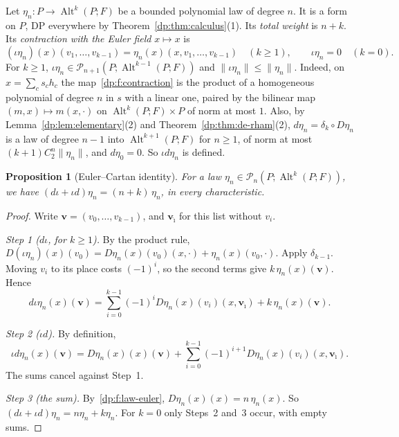 \documentclass[11pt]{amsart}
\newtheorem{proposition}[theorem]{Proposition}
\theoremstyle{definition}
\theoremstyle{remark}
\numberwithin{equation}{section}
\newcommand{\Alt}{\operatorname{Alt}}
\newcommand{\norm}[1]{\lVert #1\rVert}
\theoremstyle{plain}
\theoremstyle{definition}
\theoremstyle{plain}
\newcommand{\cP}{\mathcal P}
\begin{document}
Let $\eta_n\colon P\to\Alt^k(P;F)$ be a bounded polynomial law of degree $n$. It is a form on $P$, DP everywhere by Theorem~\ref{dp:thm:calculus}(1). Its \emph{total weight} is $n+k$. Its \emph{contraction with the Euler field} $x\mapsto x$ is
\begin{equation}\label{dp:f:contraction}
 (\iota\eta_n)(x)(v_1,\dots,v_{k-1})=\eta_n(x)(x,v_1,\dots,v_{k-1})\quad(k\ge1),\qquad\iota\eta_n=0\quad(k=0).
\end{equation}
For $k\ge1$, $\iota\eta_n\in\cP_{n+1}(P;\Alt^{k-1}(P;F))$ and $\norm{\iota\eta_n}\le\norm{\eta_n}$. Indeed, on $x=\sum_cs_ch_c$ the map~\eqref{dp:f:contraction} is the product of a homogeneous polynomial of degree $n$ in $s$ with a linear one, paired by the bilinear map $(m,x)\mapsto m(x,\cdot)$ on $\Alt^k(P;F)\times P$ of norm at most $1$. Also, by Lemma~\ref{dp:lem:elementary}(2) and Theorem~\ref{dp:thm:de-rham}(2), $d\eta_n=\delta_k\circ D\eta_n$ is a law of degree $n-1$ into $\Alt^{k+1}(P;F)$ for $n\ge1$, of norm at most $(k+1)C_2^n\norm{\eta_n}$, and $d\eta_0=0$. So $\iota d\eta_n$ is defined.

\begin{proposition}[Euler--Cartan identity]\label{dp:prop:euler}
For a law $\eta_n\in\cP_n(P;\Alt^k(P;F))$, we have $(d\iota+\iota d)\eta_n=(n+k)\,\eta_n$, in every characteristic.
\end{proposition}

\begin{proof}
Write $\mathbf v=(v_0,\dots,v_{k-1})$, and $\mathbf v_{\hat\imath}$ for this list without $v_i$.

\emph{Step 1 ($d\iota$, for $k\ge1$).} By the product rule, $D(\iota\eta_n)(x)(v_0)=D\eta_n(x)(v_0)(x,\cdot)+\eta_n(x)(v_0,\cdot)$. Apply $\delta_{k-1}$. Moving $v_i$ to its place costs $(-1)^i$, so the second terms give $k\,\eta_n(x)(\mathbf v)$. Hence
\[
 d\iota\eta_n(x)(\mathbf v)=\sum_{i=0}^{k-1}(-1)^iD\eta_n(x)(v_i)(x,\mathbf v_{\hat\imath})+k\,\eta_n(x)(\mathbf v).
\]

\emph{Step 2 ($\iota d$).} By definition,
\[
 \iota d\eta_n(x)(\mathbf v)=D\eta_n(x)(x)(\mathbf v)+\sum_{i=0}^{k-1}(-1)^{i+1}D\eta_n(x)(v_i)(x,\mathbf v_{\hat\imath}).
\]
The sums cancel against Step~1.

\emph{Step 3 (the sum).} By~\eqref{dp:f:law-euler}, $D\eta_n(x)(x)=n\,\eta_n(x)$. So $(d\iota+\iota d)\eta_n=n\eta_n+k\eta_n$. For $k=0$ only Steps~2 and~3 occur, with empty sums.
\end{proof}
\end{document}
